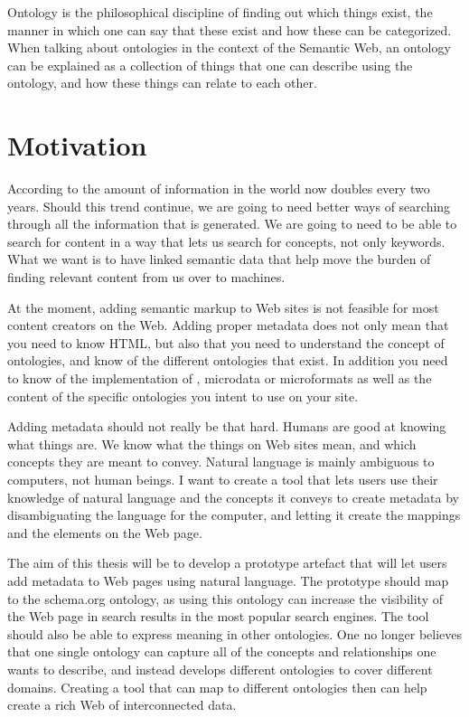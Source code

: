 Ontology is the philosophical discipline of finding out which things exist,
the manner in which one can say that these exist and how these can be categorized.
When talking about ontologies in the context of the Semantic Web,
an ontology can be explained as a collection of things that one can describe using the ontology,
and how these things can relate to each other.


\section{Motivation}
According to \citet{Gantz2011} the amount of information in the world now doubles every two years.
Should this trend continue, we are going to need better ways of searching through all the information that is generated.
We are going to need to be able to search for content in a way that lets us search for concepts, not only keywords.
What we want is to have linked semantic data that help move the burden of finding relevant content from us over to machines.

At the moment, adding semantic markup to Web sites is not feasible for most content creators on the Web.
Adding proper metadata does not only mean that you need to know HTML,
but also that you need to understand the concept of ontologies, and know of the different ontologies that exist.
In addition you need to know of the implementation of , microdata or microformats
as well as the content of the specific ontologies you intent to use on your site.

Adding metadata should not really be that hard.
Humans are good at knowing what things are.
We know what the things on Web sites mean, and which concepts they are meant to convey.
Natural language is mainly ambiguous to computers, not human beings.
I want to create a tool that lets users use their knowledge of natural language and the concepts it conveys
to create metadata by disambiguating the language for the computer, and letting it create the mappings and the elements on the Web page.

The aim of this thesis will be to develop a prototype artefact that will let users add metadata to Web pages using natural language.
The prototype should map to the schema.org ontology,
as using this ontology can increase the visibility of the Web page in search results in the most popular search engines.
The tool should also be able to express meaning in other ontologies.
One no longer believes that one single ontology can capture all of the concepts and relationships one wants to describe,
and instead develops different ontologies to cover different domains.
Creating a tool that can map to different ontologies then can help create a rich Web of interconnected data.

